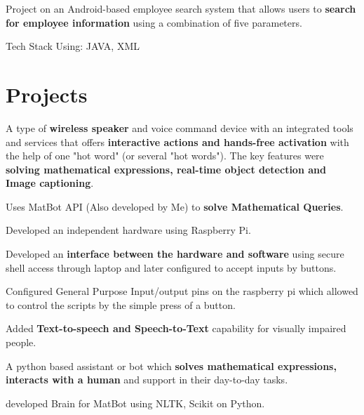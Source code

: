 \documentclass[a4paper]{deedy-resume-openfont}
\begin{document}
\begin{minipage}[t]{0.66\textwidth}

\begin{tightemize}
 \item Project on an Android-based employee search system that allows users to \textbf{search for employee information} using a combination of five parameters.
 \item Tech Stack Using: JAVA, XML
\end{tightemize}
\sectionsep


\section{Projects}
 A type of \textbf{wireless speaker} and voice command device with an integrated tools and services that offers \textbf{interactive actions and hands-free activation} with the help of one "hot word" (or several "hot words"). The key features were \textbf{solving mathematical expressions, real-time object detection and Image captioning}.
\begin{tightemize}
 \item Uses MatBot API (Also developed by Me) to \textbf{solve Mathematical Queries}.
 \item Developed an independent hardware using Raspberry Pi.
 \item Developed an\textbf{ interface between the hardware and software} using secure shell access through laptop and later configured to accept inputs by buttons.
 \item Configured General Purpose Input/output pins on the raspberry pi which allowed to control the scripts by the simple press of a button.
 \item Added \textbf{Text-to-speech and Speech-to-Text} capability for visually impaired people.
\end{tightemize}
\sectionsep
%
A python based assistant or bot which \textbf{solves mathematical expressions, interacts with a human} and support in their day-to-day tasks.
\begin{tightemize}
 \item developed Brain for MatBot using NLTK, Scikit on Python.

\end{tightemize}
\end{minipage}
\end{document}
